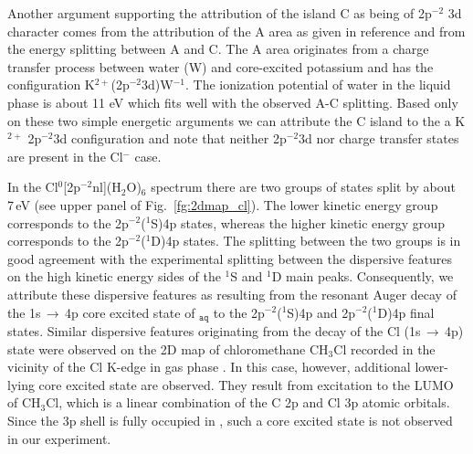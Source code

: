 Another argument supporting the attribution of the island C as being of 2p$^{-2}$ 3d character comes from the attribution of the A area as given in reference \cite{ceolin17:263003} and from the energy splitting between A and C. The A area originates from a charge transfer process between water (W) and core-excited potassium and has the configuration K$^{2+}$(2p$^{-2}$3d)W$^{-1}$. The ionization potential of water in the liquid phase is about 11 eV which fits well with the observed A-C splitting. Based only on these two simple energetic arguments we can attribute the C island to the a K$^{2+}$ 2p$^{-2}$3d configuration and note that neither 2p$^{-2}$3d nor charge transfer states are present in the Cl$^{-}$ case.


In the Cl$^{0}$[2p$^{-2}$nl](H$_2$O)$_6$ spectrum there are two groups of states split by about 7\,eV (see upper panel of Fig.\ \ref{fg:2dmap_cl}). The lower kinetic energy group corresponds to the 2p$^{-2}$($^1$S)4p states, whereas the higher kinetic energy group corresponds to the 2p$^{-2}$($^1$D)4p states. The splitting between the two groups is in good agreement with the experimental splitting between the dispersive features on the high kinetic energy sides of the $^1$S and $^1$D main peaks. Consequently, we attribute these dispersive features as resulting from the resonant Auger decay of the 1s$\,\rightarrow\,$4p core excited state of \cli$_{\texttt{aq}}$ to the 2p$^{-2}$($^1$S)4p and  2p$^{-2}$($^1$D)4p final states. Similar dispersive features originating from the decay of the Cl (1s$\,\rightarrow\,$4p) state were observed on the 2D map of chloromethane CH$_3$Cl recorded in the vicinity of the Cl K-edge in gas phase \cite{gold16:133001}. In this case, however, additional lower-lying core excited state are observed. They result from excitation to the LUMO of CH$_3$Cl, which is a linear combination of the C 2p and Cl 3p atomic orbitals. Since the 3p shell is fully occupied in \cli, such a core excited state is not observed in our experiment.


